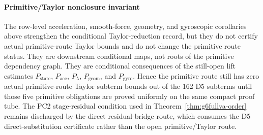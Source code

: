 \documentclass[preprint,12pt]{elsarticle}
\begin{document}
\paragraph{Primitive/Taylor nonclosure invariant}
The row-level acceleration, smooth-force, geometry, and gyroscopic corollaries above strengthen the
conditional Taylor-reduction record, but they do not certify actual
primitive-route Taylor bounds and do not change the primitive route status.
They are downstream conditional maps, not roots of the primitive dependency
graph.
They are conditional consequences of the still-open lift estimates
\(P_{\mathrm{state}}\), \(P_{\mathrm{acc}}\), \(P_{\lambda}\),
\(P_{\mathrm{geom}}\), and \(P_{\mathrm{gyro}}\).  Hence the primitive
route still has zero actual primitive-route Taylor subterm bounds out of the 162
D5 subterms until those five primitive obligations are proved uniformly on
the same compact proof tube.  The PC2 stage-residual condition used in
Theorem~\ref{thm:g6fullva-order} remains discharged by the direct
residual-bridge route, which consumes the D5 direct-substitution certificate rather than the
open primitive/Taylor route.
\end{document}
